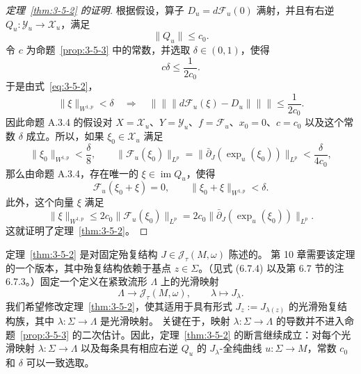 \begin{proof}[定理~\ref{thm:3-5-2} 的证明]
根据假设，算子 $D_u=d\mathcal F_u(0)$ 满射，并且有右逆
$Q_u:\mathcal Y_u\to\mathcal X_u$，满足
\[
  \lVert Q_u\rVert\le c_0.
\]
令 $c$ 为命题~\ref{prop:3-5-3} 中的常数，并选取 $\delta\in(0,1)$，使得
\[
  c\delta\le\frac1{2c_0}.
\]
于是由式~\eqref{eq:3-5-2}，
\[
  \lVert\xi\rVert_{W^{1,p}}<\delta
  \quad\Longrightarrow\quad
  \lVert\!\lVert\!\lVert
  d\mathcal F_u(\xi)-D_u
  \rVert\!\rVert\!\rVert
  \le\frac1{2c_0}.
\]
因此命题 A.3.4 的假设对
$X=\mathcal X_u$、$Y=\mathcal Y_u$、$f=\mathcal F_u$、$x_0=0$、$c=c_0$ 以及这个常数
$\delta$ 成立。所以，如果 $\xi_0\in\mathcal X_u$ 满足
\[
  \lVert\xi_0\rVert_{W^{1,p}}<\frac\delta8,
  \qquad
  \lVert\mathcal F_u(\xi_0)\rVert_{L^p}
  =\bigl\lVert\bar\partial_J(\exp_u(\xi_0))\bigr\rVert_{L^p}
  <\frac\delta{4c_0},
\]
那么由命题 A.3.4，存在唯一的 $\xi\in\operatorname{im}Q_u$，使得
\[
  \mathcal F_u(\xi_0+\xi)=0,
  \qquad
  \lVert\xi_0+\xi\rVert_{W^{1,p}}<\delta.
\]
此外，这个向量 $\xi$ 满足
\[
  \lVert\xi\rVert_{W^{1,p}}
  \le2c_0\lVert\mathcal F_u(\xi_0)\rVert_{L^p}
  =2c_0\bigl\lVert\bar\partial_J(\exp_u(\xi_0))\bigr\rVert_{L^p}.
\]
这就证明了定理~\ref{thm:3-5-2}。
\end{proof}

\begin{remark}\label{rem:3-5-4}
定理~\ref{thm:3-5-2} 是对固定殆复结构 $J\in\mathcal J_\tau(M,\omega)$ 陈述的。
第 10 章需要该定理的一个版本，其中殆复结构依赖于基点 $z\in\Sigma$。（见式 (6.7.4)
以及第 6.7 节的注 6.7.3。）固定一个定义在紧致流形 $\Lambda$ 上的光滑映射
\[
  \Lambda\longrightarrow\mathcal J_\tau(M,\omega),
  \qquad \lambda\longmapsto J_\lambda.
\]
我们希望修改定理~\ref{thm:3-5-2}，使其适用于具有形式
$J_z:=J_{\lambda(z)}$ 的光滑殆复结构族，其中 $\lambda:\Sigma\to\Lambda$ 是光滑映射。
关键在于，映射 $\lambda:\Sigma\to\Lambda$ 的导数并不进入命题~\ref{prop:3-5-3}
的二次估计。因此，定理~\ref{thm:3-5-2} 的断言继续成立：对每个光滑映射
$\lambda:\Sigma\to\Lambda$ 以及每条具有相应右逆 $Q_u$ 的 $J_\lambda$-全纯曲线
$u:\Sigma\to M$，常数 $c_0$ 和 $\delta$ 可以一致选取。
\end{remark}


